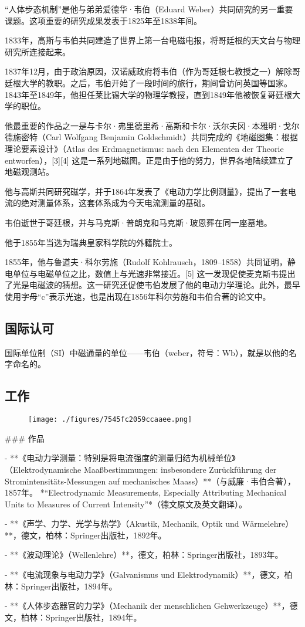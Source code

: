 “人体步态机制”是他与弟弟爱德华·韦伯（Eduard Weber）共同研究的另一重要课题。这项重要的研究成果发表于1825年至1838年间。  

1833年，高斯与韦伯共同建造了世界上第一台电磁电报，将哥廷根的天文台与物理研究所连接起来。

1837年12月，由于政治原因，汉诺威政府将韦伯（作为哥廷根七教授之一）解除哥廷根大学的教职。之后，韦伯开始了一段时间的旅行，期间曾访问英国等国家。1843年至1849年，他担任莱比锡大学的物理学教授，直到1849年他被恢复哥廷根大学的职位。  

他最重要的作品之一是与卡尔·弗里德里希·高斯和卡尔·沃尔夫冈·本雅明·戈尔德施密特（Carl Wolfgang Benjamin Goldschmidt）共同完成的《地磁图集：根据理论要素设计》（Atlas des Erdmagnetismus: nach den Elementen der Theorie entworfen），[3][4] 这是一系列地磁图。正是由于他的努力，世界各地陆续建立了地磁观测站。  

他与高斯共同研究磁学，并于1864年发表了《电动力学比例测量》，提出了一套电流的绝对测量体系，这套体系成为今天电流测量的基础。  

韦伯逝世于哥廷根，并与马克斯·普朗克和马克斯·玻恩葬在同一座墓地。

他于1855年当选为瑞典皇家科学院的外籍院士。

1855年，他与鲁道夫·科尔劳施（Rudolf Kohlrausch，1809–1858）共同证明，静电单位与电磁单位之比，数值上与光速非常接近。[5] 这一发现促使麦克斯韦提出了光是电磁波的猜想。这一研究还促使韦伯发展了他的电动力学理论。此外，最早使用字母“c”表示光速，也是出现在1856年科尔劳施和韦伯合著的论文中。
\subsection{国际认可}  
国际单位制（SI）中磁通量的单位——韦伯（weber，符号：Wb），就是以他的名字命名的。
\subsection{工作}
\begin{figure}[ht]
\centering
\texttt{[image: ./figures/7545fc2059ccaaee.png]}
\caption{} \label{fig_Eduard_2}
\end{figure}
### 作品  

- **《电动力学测量：特别是将电流强度的测量归结为机械单位》（Elektrodynamische Maaßbestimmungen: insbesondere Zurückführung der Stromintensitäts-Messungen auf mechanisches Maass）**（与威廉·韦伯合著），1857年。  
   *“Electrodynamic Measurements, Especially Attributing Mechanical Units to Measures of Current Intensity”*（德文原文及英文翻译）。

- **《声学、力学、光学与热学》（Akustik, Mechanik, Optik und Wärmelehre）**，德文，柏林：Springer出版社，1892年。

- **《波动理论》（Wellenlehre）**，德文，柏林：Springer出版社，1893年。

- **《电流现象与电动力学》（Galvanismus und Elektrodynamik）**，德文，柏林：Springer出版社，1894年。

- **《人体步态器官的力学》（Mechanik der menschlichen Gehwerkzeuge）**，德文，柏林：Springer出版社，1894年。